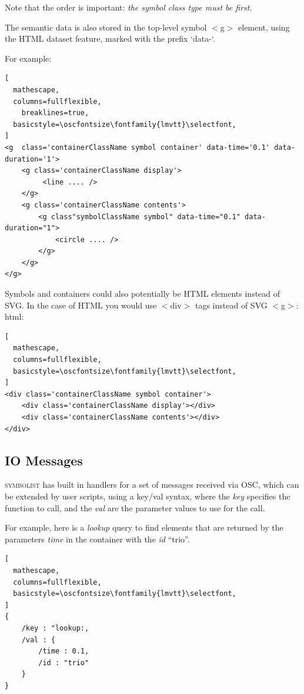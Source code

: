 \documentclass{article}
\def\symbolist{\textsc{symbolist}\xspace}
\def\oscfontsize{\footnotesize}
\begin{document}
Note that the order is important: \textit{the symbol class type must be first}.

The semantic data is also stored in the top-level symbol $<$g$>$ element, using the HTML dataset feature, marked with the prefix `data-`.

For example:

\begin{lstlisting}[
  mathescape,
  columns=fullflexible,
    breaklines=true,
  basicstyle=\oscfontsize\fontfamily{lmvtt}\selectfont,
]
<g  class='containerClassName symbol container' data-time='0.1' data-duration='1'>
    <g class='containerClassName display'>
         <line .... />
    </g>
    <g class='containerClassName contents'>
        <g class"symbolClassName symbol" data-time="0.1" data-duration="1">
            <circle .... />
        </g>
    </g>
</g>
\end{lstlisting}


Symbols and containers could also potentially be HTML elements instead of SVG. In the case of HTML you would use $<$div$>$ tags instead of SVG $<$g$>$:
html:

\begin{lstlisting}[
  mathescape,
  columns=fullflexible,
  basicstyle=\oscfontsize\fontfamily{lmvtt}\selectfont,
]
<div class='containerClassName symbol container'>
    <div class='containerClassName display'></div>
    <div class='containerClassName contents'></div>
</div>
\end{lstlisting}




\subsection{IO Messages}\label{subsec:io_messages}

\symbolist has built in handlers for a set of messages received via OSC, which can be extended by user scripts, using a key/val syntax, where the \textit{key} specifies the function to call, and the \textit{val} are the parameter values to use for the call.

For example, here is a \textit{lookup} query to find elements that are returned by the parameters \textit{time} in the container with the \textit{id} ``trio''.


\begin{lstlisting}[
  mathescape,
  columns=fullflexible,
  basicstyle=\oscfontsize\fontfamily{lmvtt}\selectfont,
]
{
    /key : "lookup:,
    /val : {
        /time : 0.1,
        /id : "trio"
    }
}

\end{lstlisting}
\end{document}
